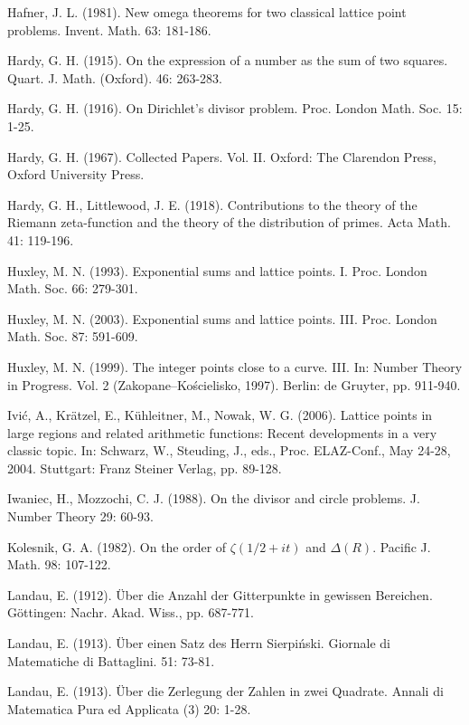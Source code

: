 \documentclass[10pt]{article}
\theoremstyle{plain}
\begin{document}
\begin{list}{}{\setlength{\leftmargin}{2.7em}\setlength{\labelwidth}{2.2em}\setlength{\itemindent}{-2.7em}\setlength{\itemsep}{0.25ex}\small}
  \item[{[13]}] Hafner, J. L. (1981). New omega theorems for two classical lattice point problems. Invent. Math. 63: 181-186.
  \item[{[14]}] Hardy, G. H. (1915). On the expression of a number as the sum of two squares. Quart. J. Math. (Oxford). 46: 263-283.
  \item[{[15]}] Hardy, G. H. (1916). On Dirichlet's divisor problem. Proc. London Math. Soc. 15: 1-25.
  \item[{[16]}] Hardy, G. H. (1967). Collected Papers. Vol. II. Oxford: The Clarendon Press, Oxford University Press.
  \item[{[17]}] Hardy, G. H., Littlewood, J. E. (1918). Contributions to the theory of the Riemann zeta-function and the theory of the distribution of primes. Acta Math. 41: 119-196.
  \item[{[18]}] Huxley, M. N. (1993). Exponential sums and lattice points. I. Proc. London Math. Soc. 66: 279-301.
  \item[{[19]}] Huxley, M. N. (2003). Exponential sums and lattice points. III. Proc. London Math. Soc. 87: 591-609.
  \item[{[20]}] Huxley, M. N. (1999). The integer points close to a curve. III. In: Number Theory in Progress. Vol. 2 (Zakopane--Kościelisko, 1997). Berlin: de Gruyter, pp. 911-940.
  \item[{[21]}] Ivić, A., Krätzel, E., Kühleitner, M., Nowak, W. G. (2006). Lattice points in large regions and related arithmetic functions: Recent developments in a very classic topic. In: Schwarz, W., Steuding, J., eds., Proc. ELAZ-Conf., May 24-28, 2004. Stuttgart: Franz Steiner Verlag, pp. 89-128.
  \item[{[22]}] Iwaniec, H., Mozzochi, C. J. (1988). On the divisor and circle problems. J. Number Theory 29: 60-93.
  \item[{[23]}] Kolesnik, G. A. (1982). On the order of $\zeta(1 / 2+i t)$ and $\Delta(R)$. Pacific J. Math. 98: 107-122.
  \item[{[24]}] Landau, E. (1912). Über die Anzahl der Gitterpunkte in gewissen Bereichen. Göttingen: Nachr. Akad. Wiss., pp. 687-771.
  \item[{[25]}] Landau, E. (1913). Über einen Satz des Herrn Sierpiński. Giornale di Matematiche di Battaglini. 51: 73-81.
  \item[{[26]}] Landau, E. (1913). Über die Zerlegung der Zahlen in zwei Quadrate. Annali di Matematica Pura ed Applicata (3) 20: 1-28.

\end{list}
\end{document}
